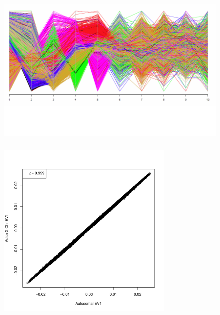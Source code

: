 \documentclass{beamer}
\begin{document}
\begin{frame}
\centering
\begin{figure}
\includegraphics[height=7.5cm]{../pca_autoX_parCoords.png}
\end{figure}
\end{frame}

\begin{frame}
\centering
\begin{figure}
\includegraphics[height=8.5cm]{../pca_autoX_auto_ev1.pdf}
\end{figure}
\end{frame}
\end{document}
